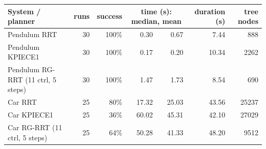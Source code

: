 \begin{tabular}{lrrrrrr}\toprule
System / planner & runs & success & \multicolumn{2}{c}{time (s): median, mean} & duration (s) & tree nodes \\ \midrule
Pendulum RRT & 30 & 100\% & 0.30 & 0.67 & 7.44 & 888 \\
Pendulum KPIECE1 & 30 & 100\% & 0.17 & 0.20 & 10.34 & 2262 \\
Pendulum RG-RRT (11 ctrl, 5 steps) & 30 & 100\% & 1.47 & 1.73 & 8.54 & 690 \\
Car RRT & 25 & 80\% & 17.32 & 25.03 & 43.56 & 25237 \\
Car KPIECE1 & 25 & 36\% & 60.02 & 45.31 & 42.10 & 27029 \\
Car RG-RRT (11 ctrl, 5 steps) & 25 & 64\% & 50.28 & 41.33 & 48.20 & 9512 \\
\bottomrule\end{tabular}
